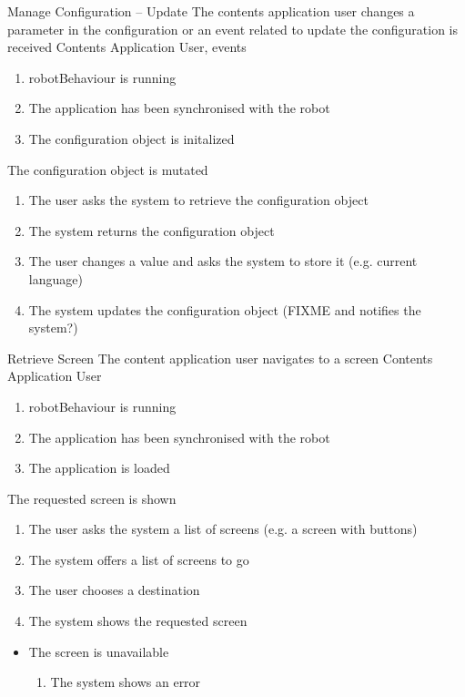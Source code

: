 \begin{suc}
{Manage Configuration -- Update}
{The contents application user changes a parameter in the configuration or an event related to update the configuration is received}
{Contents Application User, events}
{
	\begin{enumerate}
        \item robotBehaviour is running
        \item The application has been synchronised with the robot
        \item The configuration object is initalized
    \end{enumerate}
}
{
The configuration object is mutated
}
{
    \begin{enumerate}
        \item The user asks the system to retrieve the configuration object
        \item The system returns the configuration object
        \item The user changes a value and asks the system to store it (e.g. current language)
		\item The system updates the configuration object (FIXME and notifies the system?)
    \end{enumerate}
}
{     
}
\end{suc}


\begin{suc}
{Retrieve Screen}
{The content application user navigates to a screen }
{Contents Application User}
{
	\begin{enumerate}
        \item robotBehaviour is running
        \item The application has been synchronised with the robot
        \item The application is loaded
    \end{enumerate}
}
{
The requested screen is shown
}
{
    \begin{enumerate}
		\item The user asks the system a list of screens (e.g. a screen with buttons)
        \item The system offers a list of screens to go
        \item The user chooses a destination
        \item The system shows the requested screen
    \end{enumerate}
}
{
    \begin{itemize}
	    \item The screen is unavailable
	    \begin{enumerate}
	    	\item The system shows an error
	    \end{enumerate}
    \end{itemize}
		
}
\end{suc}

